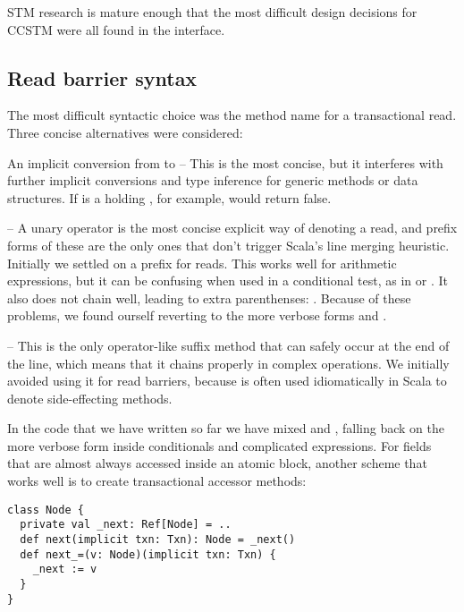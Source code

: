 
STM research is mature enough that the most difficult design decisions
for CCSTM were all found in the interface.

\subsection{Read barrier syntax}
\label{sec:syntax}

The most difficult syntactic choice was the method name for a
transactional read.  Three concise alternatives were considered:

\begin{packed_enum}

\item An implicit conversion from  to  -- This is
the most concise, but it interferes with further implicit conversions and type
inference for generic methods or data structures.  If  is a
 holding , for example, 
would return false.

\item {} -- A unary operator is the most concise explicit
way of denoting a read, and prefix forms of these are the only ones that don't
trigger Scala's line merging heuristic.  Initially we settled on a \code{!}
prefix for reads.  This works well for arithmetic expressions, but it can be
confusing when used in a conditional test, as in
 or .  It also does not chain well,
leading to extra parenthenses: .  Because of these problems,
we found ourself reverting to the more verbose forms 
and .

\item {} -- This is the only operator-like suffix method
that can safely occur at the end of the line, which means that it chains
properly in complex operations.  We initially avoided using it for read
barriers, because \code{()} is often used idiomatically in Scala to
denote side-effecting methods.


\end{packed_enum}

\color{green}
In the code that we have written so far we have mixed  and
, falling back on the more verbose form inside conditionals and
complicated expressions.  For fields that are almost always accessed inside
an atomic block, another scheme that works well is to create transactional
accessor methods:
\lstset{numbers=none}
\begin{lstlisting}
class Node {
  private val _next: Ref[Node] = ..
  def next(implicit txn: Txn): Node = _next()
  def next_=(v: Node)(implicit txn: Txn) {
    _next := v
  }
}
\end{lstlisting}
\lstset{numbers=left}

